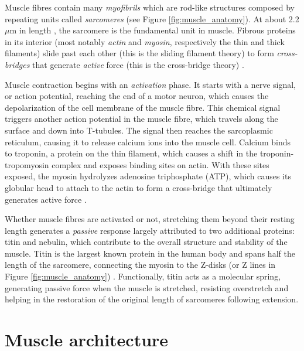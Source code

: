 \documentclass{sfuthesis}
\numberwithin{equation}{section}
\numberwithin{figure}{chapter}
\numberwithin{table}{chapter}
\theoremstyle{definition}
\begin{document}
Muscle fibres contain many \textit{myofibrils} which are rod-like structures composed by repeating units called \textit{sarcomeres} (see Figure \ref{fig:muscle_anatomy}). At about 2.2 $\mu$m in length \cite{burkholder2001sarcomere}, the sarcomere is the fundamental unit in muscle. Fibrous proteins in its interior (most notably \textit{actin} and \textit{myosin}, respectively the thin and thick filaments) slide past each other (this is the sliding filament theory) to form \textit{cross-bridges} that generate \textit{active} force (this is the cross-bridge theory) \cite{HansonHuxley1953,HuxleyNiedergerke1954}.

Muscle contraction begins with an \textit{activation} phase. It starts with a nerve signal, or action potential, reaching the end of a motor neuron, which causes the depolarization of the cell membrane of the muscle fibre. This chemical signal triggers another action potential in the muscle fibre, which travels along the surface and down into T-tubules. The signal then reaches the sarcoplasmic reticulum, causing it to release calcium ions into the muscle cell. Calcium binds to troponin, a protein on the thin filament, which causes a shift in the troponin-tropomyosin complex and exposes binding sites on actin. With these sites exposed, the myosin hydrolyzes adenosine triphosphate (ATP), which causes its globular head to attach to the actin to form a cross-bridge that ultimately generates active force \cite{Ruegg2012Calcium}.

Whether muscle fibres are activated or not, stretching them beyond their resting length generates a \textit{passive} response largely attributed to two additional proteins: titin and nebulin, which contribute to the overall structure and stability of the muscle. Titin is the largest known protein in the human body and spans half the length of the sarcomere, connecting the myosin to the Z-disks (or Z lines in Figure \ref{fig:muscle_anatomy}) \cite{Nishikawa2020, Nishikawa2012WindingFilament}. Functionally, titin acts as a molecular spring, generating passive force when the muscle is stretched, resisting overstretch and helping in the restoration of the original length of sarcomeres following extension.

\section{Muscle architecture} \label{sec:intro_muscle_architecture}
\end{document}
